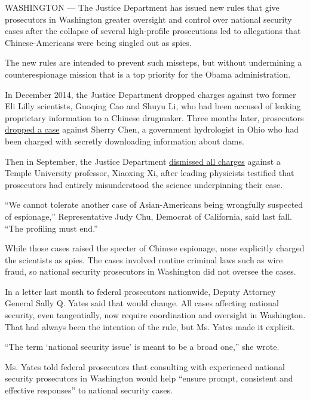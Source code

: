 WASHINGTON --- The Justice Department has issued new rules that give
prosecutors in Washington greater oversight and control over national
security cases after the collapse of several high-profile prosecutions
led to allegations that Chinese-Americans were being singled out as
spies.

The new rules are intended to prevent such missteps, but without
undermining a counterespionage mission that is a top priority for the
Obama administration.

In December 2014, the Justice Department dropped charges against two
former Eli Lilly scientists, Guoqing Cao and Shuyu Li, who had been
accused of leaking proprietary information to a Chinese drugmaker. Three
months later, prosecutors
\href{http://www.nytimes3xbfgragh.onion/2015/05/10/business/accused-of-spying-for-china-until-she-wasnt.html?_r=0}{dropped
a case} against Sherry Chen, a government hydrologist in Ohio who had
been charged with secretly downloading information about dams.

Then in September, the Justice Department
\href{http://www.nytimes3xbfgragh.onion/2015/09/12/us/politics/us-drops-charges-that-professor-shared-technology-with-china.html}{dismissed
all charges} against a Temple University professor, Xiaoxing Xi, after
leading physicists testified that prosecutors had entirely misunderstood
the science underpinning their case.

``We cannot tolerate another case of Asian-Americans being wrongfully
suspected of espionage,'' Representative Judy Chu, Democrat of
California, said last fall. ``The profiling must end.''

While those cases raised the specter of Chinese espionage, none
explicitly charged the scientists as spies. The cases involved routine
criminal laws such as wire fraud, so national security prosecutors in
Washington did not oversee the cases.

In a letter last month to federal prosecutors nationwide, Deputy
Attorney General Sally Q. Yates said that would change. All cases
affecting national security, even tangentially, now require coordination
and oversight in Washington. That had always been the intention of the
rule, but Ms. Yates made it explicit.

``The term `national security issue' is meant to be a broad one,'' she
wrote.

Ms. Yates told federal prosecutors that consulting with experienced
national security prosecutors in Washington would help ``ensure prompt,
consistent and effective responses'' to national security cases.

